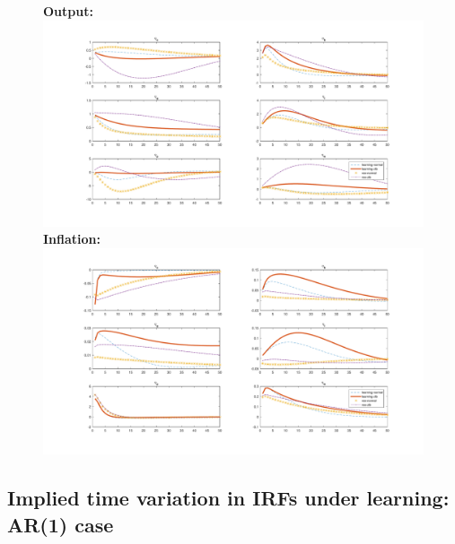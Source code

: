 \documentclass[12pt,reqno]{article}
\numberwithin{equation}{section}
\begin{document}
\begin{figure}[H]
\textbf{Output:}\\
\includegraphics[scale=0.5]{MSV_impresp_output_riseComp.pdf}
\textbf{Inflation:}\\
\includegraphics[scale=0.5]{MSV_impresp_pinf_riseComp.pdf}

\end{figure}

\subsection*{Implied time variation in IRFs under learning: AR(1) case}
\end{document}

